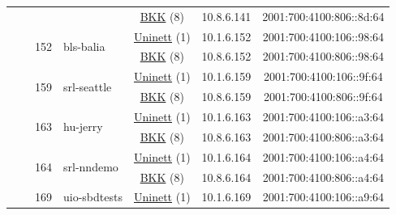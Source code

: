 \begin{small}
\begin{center}
\begin{longtable}{|c|c|c|c|c|c|c|c|}
  &  &  &  & \multicolumn{2}{|c|}{\tiny{\href{http://bkk.no}{BKK} (8)}} & \tiny{10.8.6.141} & \tiny{2001:700:4100:806::8d:64} \\* \cline{3-3}\cline{4-4}\cline{5-5}\cline{6-6}\cline{7-7}\cline{8-8}
  &  & \multirow{2}{*}{\tiny{152}} & \multicolumn{1}{|l|}{\multirow{2}{*}{\tiny{bls-balia}}} & \multicolumn{2}{|c|}{\tiny{\href{https://www.uninett.no}{Uninett} (1)}} & \tiny{10.1.6.152} & \tiny{2001:700:4100:106::98:64} \\* \cline{5-5}\cline{6-6}\cline{7-7}\cline{8-8}
  &  &  &  & \multicolumn{2}{|c|}{\tiny{\href{http://bkk.no}{BKK} (8)}} & \tiny{10.8.6.152} & \tiny{2001:700:4100:806::98:64} \\* \cline{3-3}\cline{4-4}\cline{5-5}\cline{6-6}\cline{7-7}\cline{8-8}
  &  & \multirow{2}{*}{\tiny{159}} & \multicolumn{1}{|l|}{\multirow{2}{*}{\tiny{srl-seattle}}} & \multicolumn{2}{|c|}{\tiny{\href{https://www.uninett.no}{Uninett} (1)}} & \tiny{10.1.6.159} & \tiny{2001:700:4100:106::9f:64} \\* \cline{5-5}\cline{6-6}\cline{7-7}\cline{8-8}
  &  &  &  & \multicolumn{2}{|c|}{\tiny{\href{http://bkk.no}{BKK} (8)}} & \tiny{10.8.6.159} & \tiny{2001:700:4100:806::9f:64} \\* \cline{3-3}\cline{4-4}\cline{5-5}\cline{6-6}\cline{7-7}\cline{8-8}
  &  & \multirow{2}{*}{\tiny{163}} & \multicolumn{1}{|l|}{\multirow{2}{*}{\tiny{hu-jerry}}} & \multicolumn{2}{|c|}{\tiny{\href{https://www.uninett.no}{Uninett} (1)}} & \tiny{10.1.6.163} & \tiny{2001:700:4100:106::a3:64} \\* \cline{5-5}\cline{6-6}\cline{7-7}\cline{8-8}
  &  &  &  & \multicolumn{2}{|c|}{\tiny{\href{http://bkk.no}{BKK} (8)}} & \tiny{10.8.6.163} & \tiny{2001:700:4100:806::a3:64} \\* \cline{3-3}\cline{4-4}\cline{5-5}\cline{6-6}\cline{7-7}\cline{8-8}
  &  & \multirow{2}{*}{\tiny{164}} & \multicolumn{1}{|l|}{\multirow{2}{*}{\tiny{srl-nndemo}}} & \multicolumn{2}{|c|}{\tiny{\href{https://www.uninett.no}{Uninett} (1)}} & \tiny{10.1.6.164} & \tiny{2001:700:4100:106::a4:64} \\* \cline{5-5}\cline{6-6}\cline{7-7}\cline{8-8}
  &  &  &  & \multicolumn{2}{|c|}{\tiny{\href{http://bkk.no}{BKK} (8)}} & \tiny{10.8.6.164} & \tiny{2001:700:4100:806::a4:64} \\* \cline{3-3}\cline{4-4}\cline{5-5}\cline{6-6}\cline{7-7}\cline{8-8}
  &  & \multirow{2}{*}{\tiny{169}} & \multicolumn{1}{|l|}{\multirow{2}{*}{\tiny{uio-sbdtests}}} & \multicolumn{2}{|c|}{\tiny{\href{https://www.uninett.no}{Uninett} (1)}} & \tiny{10.1.6.169} & \tiny{2001:700:4100:106::a9:64} \\* \cline{5-5}\cline{6-6}\cline{7-7}\cline{8-8}

\end{longtable}
\end{center}
\end{small}
